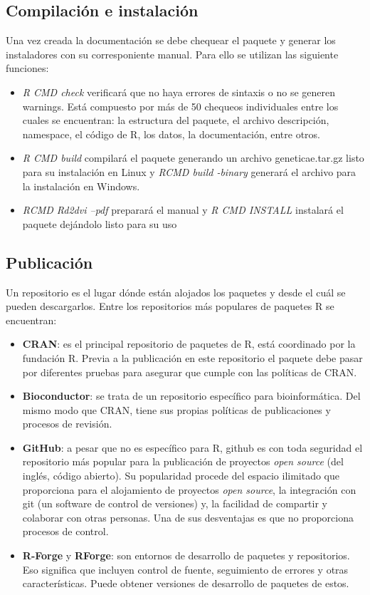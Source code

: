 \subsection{Compilación e instalación}
Una vez creada la documentación se debe chequear el paquete y generar los instaladores con su corresponiente manual. Para ello se utilizan las siguiente funciones:
\begin{itemize}
\item \emph{R CMD check} verificará que no haya errores de sintaxis o no se generen warnings. Está compuesto por más de 50 chequeos individuales entre los cuales se encuentran: la estructura del paquete, el archivo descripción, namespace, el código de R, los datos, la documentación, entre otros.
\item  \emph{R CMD build} compilará el paquete generando un archivo geneticae.tar.gz listo para su instalación en Linux y \emph{RCMD build -binary} generará el archivo para la instalación en Windows.
\item \emph{RCMD Rd2dvi --pdf} preparará el manual y \emph{R CMD INSTALL} instalará el paquete dejándolo listo para su uso
\end{itemize}

\subsection{Publicación}
Un repositorio es el lugar dónde están alojados los paquetes y desde el cuál se pueden descargarlos. Entre los repositorios más populares de paquetes R se encuentran:

\begin{itemize}
\item \textbf{CRAN}: es el principal repositorio de paquetes de R, está coordinado por la fundación R. Previa a la publicación en este repositorio el paquete debe pasar por diferentes pruebas para asegurar que cumple con las políticas de CRAN.

\item \textbf{Bioconductor}: se trata de un repositorio específico para bioinformática. Del mismo modo que CRAN, tiene sus propias políticas de publicaciones y procesos de revisión.

\item \textbf{GitHub}: a pesar que no es específico para R, github es con toda seguridad el repositorio más popular para la publicación de proyectos \emph{open source} (del inglés, código abierto). Su popularidad procede del espacio ilimitado que proporciona para el alojamiento de proyectos \emph{open source}, la integración con git (un software de control de versiones) y, la facilidad de compartir y colaborar con otras personas. Una de sus desventajas es que no proporciona procesos de control.

\item \textbf{R-Forge} y \textbf{RForge}: son entornos de desarrollo de paquetes y repositorios. Eso significa que incluyen control de fuente, seguimiento de errores y otras características. Puede obtener versiones de desarrollo de paquetes de estos.
\end{itemize}

